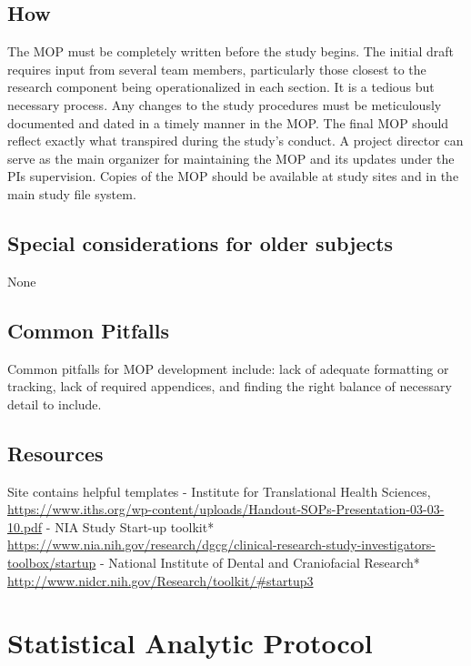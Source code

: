 \documentclass[]{book}
\begin{document}
\subsection{How}\label{how-12}

The MOP must be completely written before the study begins. The initial
draft requires input from several team members, particularly those
closest to the research component being operationalized in each section.
It is a tedious but necessary process. Any changes to the study
procedures must be meticulously documented and dated in a timely manner
in the MOP. The final MOP should reflect exactly what transpired during
the study's conduct. A project director can serve as the main organizer
for maintaining the MOP and its updates under the PIs supervision.
Copies of the MOP should be available at study sites and in the main
study file system.

\subsection{Special considerations for older
subjects}\label{special-considerations-for-older-subjects-8}

None

\subsection{Common Pitfalls}\label{common-pitfalls-11}

Common pitfalls for MOP development include: lack of adequate formatting
or tracking, lack of required appendices, and finding the right balance
of necessary detail to include.

\subsection{Resources}\label{resources-13}

Site contains helpful templates - Institute for Translational Health
Sciences,
\url{https://www.iths.org/wp-content/uploads/Handout-SOPs-Presentation-03-03-10.pdf}
- NIA Study Start-up toolkit*
\url{https://www.nia.nih.gov/research/dgcg/clinical-research-study-investigators-toolbox/startup}
- National Institute of Dental and Craniofacial Research*
\url{http://www.nidcr.nih.gov/Research/toolkit/\#startup3}

\section{Statistical Analytic
Protocol}\label{statistical-analytic-protocol}
\end{document}
